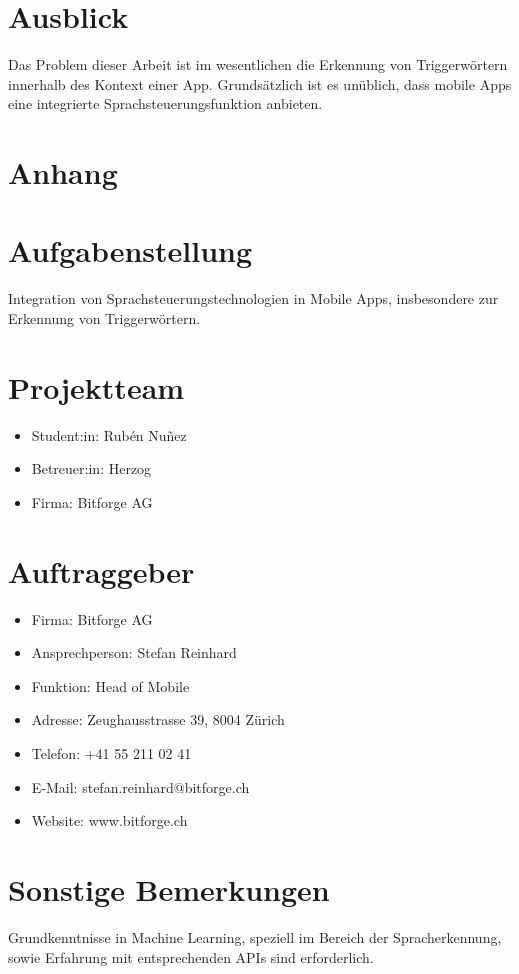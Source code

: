 \documentclass[11pt,a4paper]{article}
\newcommand\blankpage{%
    \null
    \thispagestyle{empty}%
    \addtocounter{page}{-1}%
    \newpage}
\begin{document}
\newpage
\section{Ausblick}
Das Problem dieser Arbeit ist im wesentlichen die Erkennung von Triggerwörtern innerhalb
des Kontext einer App. Grundsätzlich ist es unüblich, dass mobile Apps eine
integrierte Sprachsteuerungsfunktion anbieten.


\newpage
\section{Anhang}

\newpage

\listoffigures
{}
\listoftables
\printbibliography[title=Literaturverzeichnis, heading=bibintoc]





\newpage
\pagecolor{ba-gray}
\afterpage{\nopagecolor}
\blankpage

\newpage
\section*{Aufgabenstellung}
Integration von Sprachsteuerungstechnologien in Mobile Apps, insbesondere zur Erkennung
von Triggerwörtern.

\section*{Projektteam}
\begin{itemize}
    \item Student:in: Rubén Nuñez
    \item Betreuer:in: Herzog
    \item Firma: Bitforge AG
\end{itemize}

\section*{Auftraggeber}
\begin{itemize}
    \item Firma: Bitforge AG
    \item Ansprechperson: Stefan Reinhard
    \item Funktion: Head of Mobile
    \item Adresse: Zeughausstrasse 39, 8004 Zürich
    \item Telefon: +41 55 211 02 41
    \item E-Mail: stefan.reinhard@bitforge.ch
    \item Website: www.bitforge.ch
\end{itemize}



\section*{Sonstige Bemerkungen}
Grundkenntnisse in Machine Learning, speziell im Bereich der Spracherkennung, sowie
Erfahrung mit entsprechenden APIs sind erforderlich.
\end{document}

